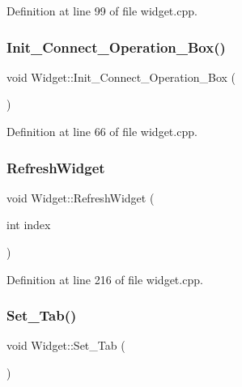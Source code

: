 Definition at line 99 of file widget.\+cpp.

\mbox{\label{class_widget_a73ede9961382ea942361e9845fa11aa0}} 
\subsubsection{\texorpdfstring{Init\_Connect\_Operation\_Box()}{Init\_Connect\_Operation\_Box()}}
{\footnotesize\ttfamily void Widget\+::\+Init\+\_\+\+Connect\+\_\+\+Operation\+\_\+\+Box (\begin{DoxyParamCaption}{ }\end{DoxyParamCaption})}



Definition at line 66 of file widget.\+cpp.

\mbox{\label{class_widget_a07120b41431597f8e2d0eb86098a6ba7}} 
\subsubsection{\texorpdfstring{RefreshWidget}{RefreshWidget}}
{\footnotesize\ttfamily void Widget\+::\+Refresh\+Widget (\begin{DoxyParamCaption}\item[{int}]{index }\end{DoxyParamCaption})\hspace{0.3cm}{\ttfamily [slot]}}



Definition at line 216 of file widget.\+cpp.

\mbox{\label{class_widget_ac611086a6f74fe7bab712f23ab7126d8}} 
\subsubsection{\texorpdfstring{Set\_Tab()}{Set\_Tab()}}
{\footnotesize\ttfamily void Widget\+::\+Set\+\_\+\+Tab (\begin{DoxyParamCaption}{ }\end{DoxyParamCaption})}



